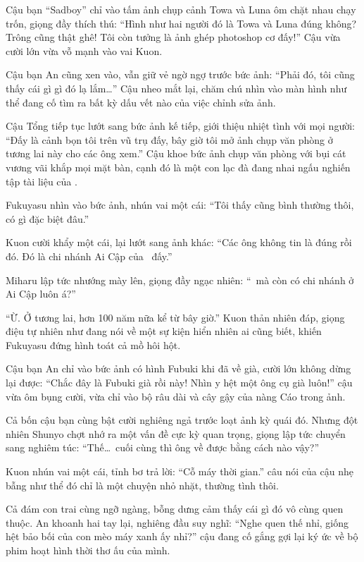 \documentclass[../main.tex]{subfiles}
\begin{document}
Cậu bạn ``Sadboy'' chỉ vào tấm ảnh chụp cảnh Towa và Luna ôm chặt nhau chạy trốn, giọng đầy thích thú: ``Hình như hai người đó là Towa và Luna đúng không? Trông cũng thật ghê! Tôi còn tưởng là ảnh ghép photoshop cơ đấy!'' Cậu vừa cười lớn vừa vỗ mạnh vào vai Kuon.

Cậu bạn An cũng xen vào, vẫn giữ vẻ ngờ ngợ trước bức ảnh: ``Phải đó, tôi cũng thấy cái gì gì đó lạ lắm\dots'' Cậu nheo mắt lại, chăm chú nhìn vào màn hình như thể đang cố tìm ra bất kỳ dấu vết nào của việc chỉnh sửa ảnh.

Cậu Tổng tiếp tục lướt sang bức ảnh kế tiếp, giới thiệu nhiệt tình với mọi người: ``Đấy là cảnh bọn tôi trên vũ trụ đấy, bây giờ tôi mở ảnh chụp văn phòng ở tương lai này cho các ông xem.'' Cậu khoe bức ảnh chụp văn phòng với bụi cát vương vãi khắp mọi mặt bàn, cạnh đó là một con lạc đà đang nhai ngấu nghiến tập tài liệu của \hll.

Fukuyasu nhìn vào bức ảnh, nhún vai một cái: ``Tôi thấy cũng bình thường thôi, có gì đặc biệt đâu.''

Kuon cười khẩy một cái, lại lướt sang ảnh khác: ``Các ông không tin là đúng rồi đó. Đó là chi nhánh Ai Cập của \hll\ đấy.''

Miharu lập tức nhướng mày lên, giọng đầy ngạc nhiên: ``\hll\ mà còn có chi nhánh ở Ai Cập luôn á?''

``Ừ. Ở tương lai, hơn 100 năm nữa kể từ bây giờ.'' Kuon thản nhiên đáp, giọng điệu tự nhiên như đang nói về một sự kiện hiển nhiên ai cũng biết, khiến Fukuyasu đứng hình toát cả mồ hôi hột.

Cậu bạn An chỉ vào bức ảnh có hình Fubuki khi đã về già, cười lớn không dừng lại được: ``Chắc đây là Fubuki già rồi này! Nhìn y hệt một ông cụ già luôn!'' cậu vừa ôm bụng cười, vừa chỉ vào bộ râu dài và cây gậy của nàng Cáo trong ảnh.

Cả bốn cậu bạn cùng bật cười nghiêng ngả trước loạt ảnh kỳ quái đó. Nhưng đột nhiên Shunyo chợt nhớ ra một vấn đề cực kỳ quan trọng, giọng lập tức chuyển sang nghiêm túc: ``Thế\dots\ cuối cùng thì ông về được bằng cách nào vậy?''

Kuon nhún vai một cái, tỉnh bơ trả lời: ``Cỗ máy thời gian.'' câu nói của cậu nhẹ bẫng như thể đó chỉ là một chuyện nhỏ nhặt, thường tình thôi.

Cả đám con trai cùng ngỡ ngàng, bỗng dưng cảm thấy cái gì đó vô cùng quen thuộc. An khoanh hai tay lại, nghiêng đầu suy nghĩ: ``Nghe quen thế nhỉ, giống hệt bảo bối của con mèo máy xanh ấy nhỉ?'' cậu đang cố gắng gợi lại ký ức về bộ phim hoạt hình thời thơ ấu của mình.
\end{document}
